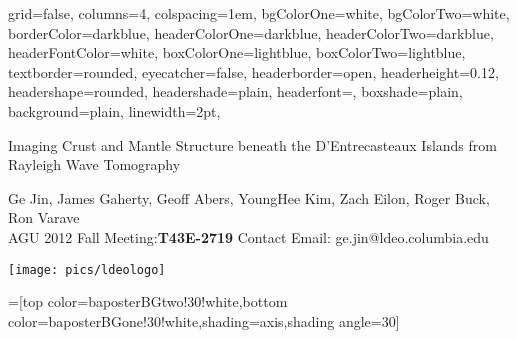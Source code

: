 \documentclass[paperwidth=65in,paperheight=43in,landscape,final,fontscale=0.23]{baposter}
\begin{document}
\begin{poster}{
  grid=false,
  columns=4,
  colspacing=1em,
  bgColorOne=white,
  bgColorTwo=white,
  borderColor=darkblue,
  headerColorOne=darkblue,
  headerColorTwo=darkblue,
  headerFontColor=white,
  boxColorOne=lightblue,
  boxColorTwo=lightblue,
  textborder=rounded,
  eyecatcher=false,
  headerborder=open,
  headerheight=0.12\textheight,  %
  headershape=rounded,
  headershade=plain,
  headerfont=\LARGE\textsf, %
  boxshade=plain,
  background=plain,
  linewidth=2pt,
  }
  {} %
  {\sf %
  \vspace{0.8em}

  Imaging Crust and Mantle Structure beneath the D'Entrecasteaux 
  Islands from Rayleigh Wave Tomography}
  {\sf %
  Ge Jin, James Gaherty, Geoff Abers, YoungHee Kim, Zach Eilon, Roger Buck, Ron Varave \\
  \small{ AGU 2012 Fall Meeting:\textbf{T43E-2719} Contact Email: ge.jin@ldeo.columbia.edu}
    }
  {
  {\begin{minipage}{30em}
	  \vfill
	  \hfill
		\texttt{[image: pics/ldeologo]}
  \end{minipage}}
  }

  =[top color=baposterBGtwo!30!white,bottom color=baposterBGone!30!white,shading=axis,shading angle=30]

     \newlength{\leftimgwidth}
     \setlength{\leftimgwidth}{0.78em+8.0em}


\end{poster}
\end{document}

